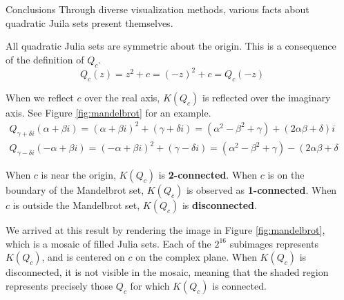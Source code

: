 \documentclass[final]{beamer}
\newlength{\sepwidth}
\newlength{\colwidth}
\newcommand{\separatorcolumn}{\begin{column}{\sepwidth}\end{column}}
\begin{document}
\begin{frame}[t]
\begin{columns}[t]
\separatorcolumn

\begin{column}{\colwidth}
	\begin{block}{Conclusions}
		Through diverse visualization methods, various facts about
		quadratic Juila sets present themselves.

		All quadratic Julia sets are symmetric about the origin.
		This is a consequence of the definition of $Q_c$. \[
			Q_c(z) = z^2 + c = (-z)^2 + c = Q_c(-z)
		\]

		When we reflect $c$ over the real axis, $K(Q_c)$
		is reflected over the imaginary axis.
		See Figure \ref{fig:mandelbrot} for an example.
		\begin{gather*}
			Q_{\gamma + \delta i}(\alpha + \beta i) = (\alpha + \beta i)^2 + (\gamma + \delta i) = (\alpha^2 - \beta^2 + \gamma) + (2\alpha \beta + \delta)i \\
			Q_{\gamma - \delta i}(-\alpha + \beta i) = (-\alpha + \beta i)^2 + (\gamma - \delta i) = (\alpha^2 - \beta^2 + \gamma) - (2\alpha \beta + \delta)i
		\end{gather*}

		When $c$ is near the origin, $K(Q_c)$
		is \textbf{2-connected}.
		When $c$ is on the boundary of the Mandelbrot set,
		$K(Q_c)$ is observed as \textbf{1-connected}.
		When $c$ is outside the Mandelbrot set,
		$K(Q_c)$ is \textbf{disconnected}.

		We arrived at this result by rendering the image in Figure \ref{fig:mandelbrot},
		which is a mosaic of filled Julia sets.
		Each of the $2^{16}$ subimages represents $K(Q_c)$,
		and is centered on $c$ on the complex plane.
		When $K(Q_c)$ is disconnected, it is not visible in the mosaic,
		meaning that the shaded region represents precisely those $Q_c$
		for which $K(Q_c)$ is connected.


\end{block}
\end{column}
\end{columns}
\end{frame}
\end{document}

